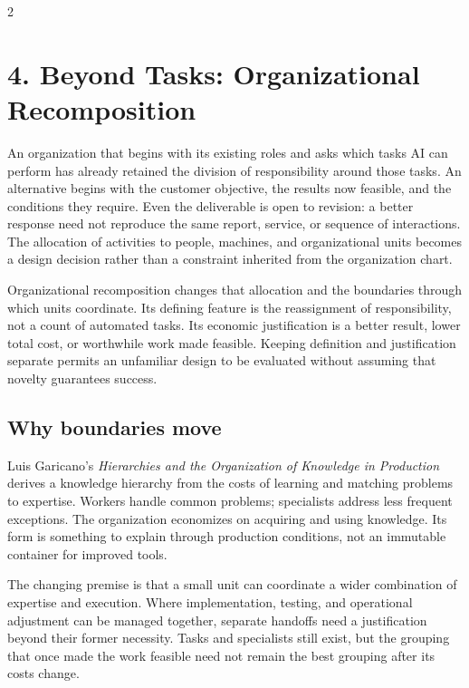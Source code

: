 \ProductionComparisonArt

\clearpage
\begin{multicols}{2}

\section{4. Beyond Tasks: Organizational
Recomposition}\label{beyond-tasks-organizational-recomposition}

An organization that begins with its existing roles and asks which tasks
AI can perform has already retained the division of responsibility
around those tasks. An alternative begins with the customer objective,
the results now feasible, and the conditions they require. Even the
deliverable is open to revision: a better response need not reproduce
the same report, service, or sequence of interactions. The allocation of
activities to people, machines, and organizational units becomes a
design decision rather than a constraint inherited from the organization
chart.

Organizational recomposition changes that allocation and the boundaries
through which units coordinate. Its defining feature is the reassignment
of responsibility, not a count of automated tasks. Its economic
justification is a better result, lower total cost, or worthwhile work
made feasible. Keeping definition and justification separate permits an
unfamiliar design to be evaluated without assuming that novelty
guarantees success.

\subsection{Why boundaries move}\label{why-boundaries-move}

Luis Garicano's \emph{Hierarchies and the Organization of Knowledge in
Production} \citep{garicano2000hierarchies} derives a knowledge
hierarchy from the costs of learning and matching problems to expertise.
Workers handle common problems; specialists address less frequent
exceptions. The organization economizes on acquiring and using
knowledge. Its form is something to explain through production
conditions, not an immutable container for improved tools.

The changing premise is that a small unit can coordinate a wider
combination of expertise and execution. Where implementation, testing,
and operational adjustment can be managed together, separate handoffs
need a justification beyond their former necessity. Tasks and
specialists still exist, but the grouping that once made the work
feasible need not remain the best grouping after its costs change.


\end{multicols}
